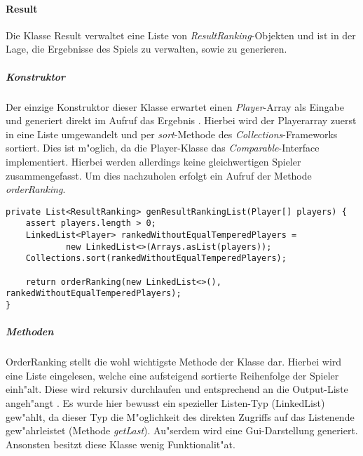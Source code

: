 \paragraph{Result}
\label{par:result}
Die Klasse Result verwaltet eine Liste von \emph{ResultRanking}-Objekten und ist in der Lage, die Ergebnisse des Spiels zu verwalten, sowie zu generieren. 

\subparagraph{Konstruktor}
Der einzige Konstruktor dieser Klasse erwartet einen \emph{Player}-Array als Eingabe und generiert direkt im Aufruf das Ergebnis . Hierbei wird der Playerarray zuerst in eine Liste umgewandelt und per \emph{sort}-Methode des \emph{Collections}-Frameworks sortiert. Dies ist m"oglich, da die Player-Klasse das \emph{Comparable}-Interface implementiert. Hierbei werden allerdings keine gleichwertigen Spieler zusammengefasst. Um dies nachzuholen erfolgt ein Aufruf der Methode \emph{orderRanking}.  
\begin{lstlisting}[float,style=CodeHighlighting,caption=Result - Konstruktor,label=lst:result_konstruktor]
private List<ResultRanking> genResultRankingList(Player[] players) {
    assert players.length > 0;
    LinkedList<Player> rankedWithoutEqualTemperedPlayers = 
    		new LinkedList<>(Arrays.asList(players));
    Collections.sort(rankedWithoutEqualTemperedPlayers);

    return orderRanking(new LinkedList<>(), rankedWithoutEqualTemperedPlayers);
}
\end{lstlisting}

\subparagraph{Methoden}
OrderRanking stellt die wohl wichtigste Methode der Klasse dar. Hierbei wird eine Liste eingelesen, welche eine aufsteigend sortierte Reihenfolge der Spieler einh"alt. Diese wird rekursiv durchlaufen und entsprechend an die Output-Liste angeh"angt . Es wurde hier bewusst ein spezieller Listen-Typ (LinkedList) gew"ahlt, da dieser Typ die M"oglichkeit des direkten Zugriffs auf das Listenende gew"ahrleistet (Methode \emph{getLast}). Au"serdem wird eine Gui-Darstellung generiert. Ansonsten besitzt diese Klasse wenig Funktionalit"at. 

